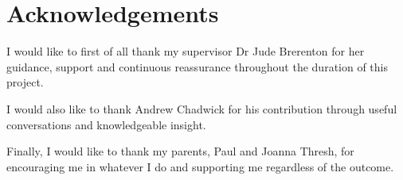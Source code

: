 \documentclass[../../main.tex]{subfiles}
\begin{document}
\clearpage
\thispagestyle{empty}

	\section{Acknowledgements}

	I would like to first of all thank my supervisor Dr Jude Brerenton for her guidance, support and continuous reassurance throughout the duration of this project.

	I would also like to thank Andrew Chadwick for his contribution through useful conversations and knowledgeable insight.

	Finally, I would like to thank my parents, Paul and Joanna Thresh, for encouraging me in whatever I do and supporting me regardless of the outcome.
\end{document}
